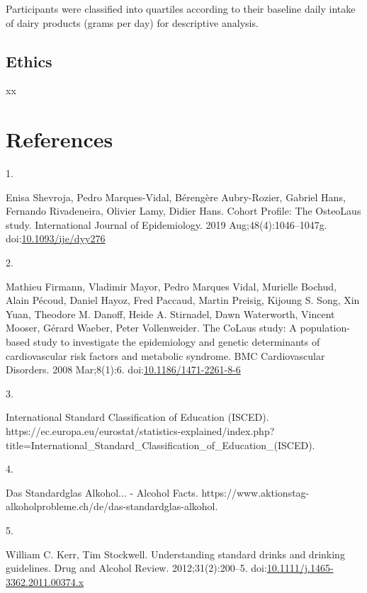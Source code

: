 \documentclass[
  11pt,
]{article}
\newlength{\cslhangindent}
\newlength{\csllabelwidth}
\newenvironment{CSLReferences}[2] %
 {\begin{list}{}{%
  \setlength{\itemindent}{0pt}
  \setlength{\leftmargin}{0pt}
  \setlength{\parsep}{0pt}
  \ifodd #1
   \setlength{\leftmargin}{\cslhangindent}
   \setlength{\itemindent}{-1\cslhangindent}
  \fi
  \setlength{\itemsep}{#2\baselineskip}}}
 {\end{list}}
\newcommand{\CSLLeftMargin}[1]{\parbox[t]{\csllabelwidth}{\strut#1\strut}}
\newcommand{\CSLRightInline}[1]{\parbox[t]{\linewidth - \csllabelwidth}{\strut#1\strut}}
\begin{document}
Participants were classified into quartiles according to their baseline
daily intake of dairy products (grams per day) for descriptive analysis.

\subsection{Ethics}\label{ethics}

xx

\section*{References}\label{bibliography}

\label{refs}
\begin{CSLReferences}{0}{1}
\CSLLeftMargin{1. }%
\CSLRightInline{Enisa Shevroja, Pedro Marques-Vidal, Bérengère
Aubry-Rozier, Gabriel Hans, Fernando Rivadeneira, Olivier Lamy, Didier
Hans. Cohort {Profile}: {The OsteoLaus} study. International Journal of
Epidemiology. 2019 Aug;48(4):1046--1047g.
doi:\href{https://doi.org/10.1093/ije/dyy276}{10.1093/ije/dyy276}}

\CSLLeftMargin{2. }%
\CSLRightInline{Mathieu Firmann, Vladimir Mayor, Pedro Marques Vidal,
Murielle Bochud, Alain Pécoud, Daniel Hayoz, Fred Paccaud, Martin
Preisig, Kijoung S. Song, Xin Yuan, Theodore M. Danoff, Heide A.
Stirnadel, Dawn Waterworth, Vincent Mooser, Gérard Waeber, Peter
Vollenweider. The {CoLaus} study: A population-based study to
investigate the epidemiology and genetic determinants of cardiovascular
risk factors and metabolic syndrome. BMC Cardiovascular Disorders. 2008
Mar;8(1):6.
doi:\href{https://doi.org/10.1186/1471-2261-8-6}{10.1186/1471-2261-8-6}}

\CSLLeftMargin{3. }%
\CSLRightInline{International {Standard Classification} of {Education}
({ISCED}).
https://ec.europa.eu/eurostat/statistics-explained/index.php?title=International\_Standard\_Classification\_of\_Education\_(ISCED).}

\CSLLeftMargin{4. }%
\CSLRightInline{Das {Standardglas Alkohol}... - {Alcohol Facts}.
https://www.aktionstag-alkoholprobleme.ch/de/das-standardglas-alkohol.}

\CSLLeftMargin{5. }%
\CSLRightInline{William C. Kerr, Tim Stockwell. Understanding standard
drinks and drinking guidelines. Drug and Alcohol Review.
2012;31(2):200--5.
doi:\href{https://doi.org/10.1111/j.1465-3362.2011.00374.x}{10.1111/j.1465-3362.2011.00374.x}}


\end{CSLReferences}
\end{document}
